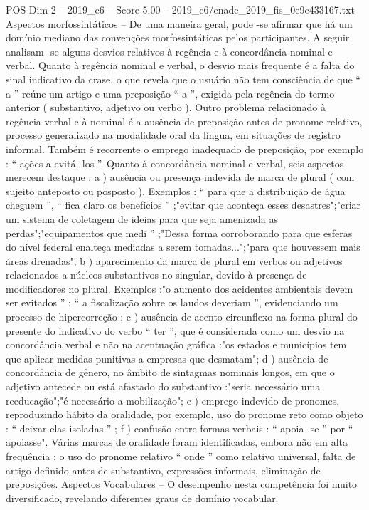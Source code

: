\begin{textsample}{POS Dim 2 – 2019\_c6 – Score 5.00 – 2019\_c6/enade\_2019\_fis\_0e9c433167.txt}
Aspectos morfossintáticos – De uma maneira geral, pode -se afirmar que há um domínio mediano das convenções morfossintáticas pelos participantes.
A seguir analisam -se alguns desvios relativos à regência e à concordância nominal e verbal.
Quanto à regência nominal e verbal, o desvio mais frequente é a falta do sinal indicativo da crase, o que revela que o usuário não tem consciência de que “ a ” reúne um artigo e uma preposição “ a ”, exigida pela regência do termo anterior ( substantivo, adjetivo ou verbo ).
Outro problema relacionado à regência verbal e à nominal é a ausência de preposição antes de pronome relativo, processo generalizado na modalidade oral da língua, em situações de registro informal.
Também é recorrente o emprego inadequado de preposição, por exemplo : “ ações a evitá -los ”.
Quanto à concordância nominal e verbal, seis aspectos merecem destaque : a ) ausência ou presença indevida de marca de plural ( com sujeito anteposto ou posposto ).
Exemplos : “ para que a distribuição de água cheguem ”, “ fica claro os benefícios ” ;"evitar que aconteça esses desastres";"criar um sistema de coletagem de ideias para que seja amenizada as perdas";"equipamentos que medi ” ;"Dessa forma corroborando para que esferas do nível federal enalteça mediadas a serem tomadas...";"para que houvessem mais áreas drenadas"; b ) aparecimento da marca de plural em verbos ou adjetivos relacionados a núcleos substantivos no singular, devido à presença de modificadores no plural.
Exemplos :"o aumento dos acidentes ambientais devem ser evitados ” ; “ a fiscalização sobre os laudos deveriam ”, evidenciando um processo de hipercorreção ; c ) ausência de acento circunflexo na forma plural do presente do indicativo do verbo “ ter ”, que é considerada como um desvio na concordância verbal e não na acentuação gráfica :"os estados e municípios tem que aplicar medidas punitivas a empresas que desmatam"; d ) ausência de concordância de gênero, no âmbito de sintagmas nominais longos, em que o adjetivo antecede ou está afastado do substantivo :"seria necessário uma reeducação";"é necessário a mobilização"; e ) emprego indevido de pronomes, reproduzindo hábito da oralidade, por exemplo, uso do pronome reto como objeto : “ deixar elas isoladas ” ; f ) confusão entre formas verbais : “ apoia -se ” por “ apoiasse".
Várias marcas de oralidade foram identificadas, embora não em alta frequência : o uso do pronome relativo “ onde ” como relativo universal, falta de artigo definido antes de substantivo, expressões informais, eliminação de preposições.
Aspectos Vocabulares – O desempenho nesta competência foi muito diversificado, revelando diferentes graus de domínio vocabular.

\end{textsample}
